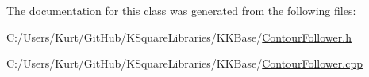 The documentation for this class was generated from the following files\+:\begin{DoxyCompactItemize}
\item 
C\+:/\+Users/\+Kurt/\+Git\+Hub/\+K\+Square\+Libraries/\+K\+K\+Base/\hyperlink{_contour_follower_8h}{Contour\+Follower.\+h}\item 
C\+:/\+Users/\+Kurt/\+Git\+Hub/\+K\+Square\+Libraries/\+K\+K\+Base/\hyperlink{_contour_follower_8cpp}{Contour\+Follower.\+cpp}\end{DoxyCompactItemize}
